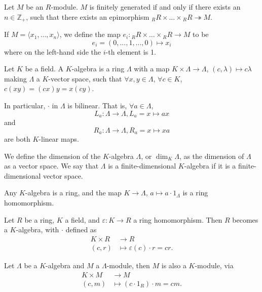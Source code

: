\documentclass[12pt, a4paper, titlepage]{report}
\newcommand\dangle[1]{\langle {#1} \rangle}
\begin{document}
\begin{prop}
  Let $M$ be an $R$-module. $M$ is finitely generated if and only if there exists an $n \in \mathbb{Z}_{+}$, such that
  there exists an epimorphism ${}_R R \times ... \times {}_R R \twoheadrightarrow M$.
\end{prop}

\begin{defn}
  If $M = \dangle{x_1, ..., x_n}$, we define the map $e_i : {}_R R \times ... \times {}_R R \to M$ to be
  \[
    e_i = (0, ..., 1, ..., 0) \mapsto x_i
  \]
  where on the left-hand side the $i$-th element is 1.
\end{defn}

\begin{defn}
  Let $K$ be a field. A $K$-algebra is a ring $\Lambda$ with a map $K \times \Lambda \to \Lambda$, $(c, \lambda) \mapsto c\lambda$
  making $\Lambda$ a $K$-vector space, such that $\forall x, y \in \Lambda$, $\forall c \in K$, $c(xy) = (cx)y = x(cy)$.

  In particular, $\cdot$ in $\Lambda$ is bilinear. That is, $\forall a \in \Lambda$,
  \[
    L_a : \Lambda \to \Lambda, L_a = x \mapsto ax
  \]
  and
  \[
    R_a : \Lambda \to \Lambda, R_a = x \mapsto xa
  \]
  are both $K$-linear maps.

  We define the dimension of the $K$-algebra $\Lambda$, or $\dim_K \Lambda$, as the dimension of $\Lambda$ as a vector space. We say that
  $\Lambda$ is a finite-dimensional $K$-algebra if it is a finite-dimensional vector space.
\end{defn}

\begin{rem}
  Any $K$-algebra is a ring, and the map $K \to \Lambda$, $a \mapsto a \cdot 1_{\Lambda}$ is a ring homomorphism.
\end{rem}

\begin{rem}
  Let $R$ be a ring, $K$ a field, and $\varepsilon : K \to R$ a ring homomorphism. Then $R$ becomes a $K$-algebra, with $\cdot$ defined as
  \begin{align*}
    K \times R &\to R\\
    (c, r) &\mapsto \varepsilon(c) \cdot r = cr.
  \end{align*}
\end{rem}

\begin{rem}
  Let $\Lambda$ be a $K$-algebra and $M$ a $\Lambda$-module, then $M$ is also a $K$-module, via
  \begin{align*}
    K \times M &\to M\\
    (c, m) &\mapsto (c \cdot 1_R) \cdot m = cm.
  \end{align*}
\end{rem}
\end{document}
